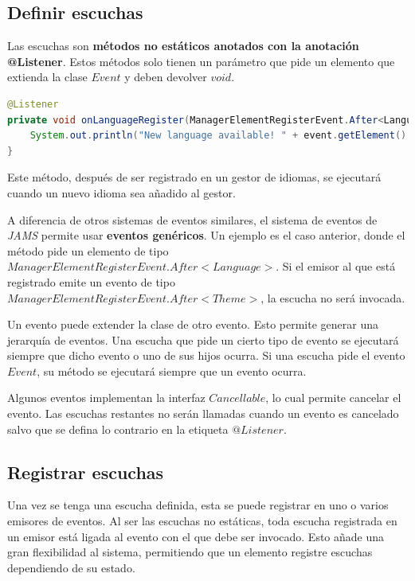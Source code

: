 \subsection{Definir escuchas}\label{subsec:definir-escuchas}

Las escuchas son \textbf{métodos no estáticos anotados con la anotación @Listener}.
Estos métodos solo tienen un parámetro que pide un elemento que extienda la clase
$Event$ y deben devolver $void$.

\begin{lstlisting}[language=Java,style=java,frame=single,label={lst:definir-escuchas}]
@Listener
private void onLanguageRegister(ManagerElementRegisterEvent.After<Language> event) {
    System.out.println("New language available! " + event.getElement().getName());
}
\end{lstlisting}

\noindent Este método, después de ser registrado en un gestor de idiomas,
se ejecutará cuando un nuevo idioma sea añadido al gestor.

\noindent A diferencia de otros sistemas de eventos similares,
el sistema de eventos de \textit{JAMS} permite usar \textbf{eventos genéricos}.
Un ejemplo es el caso anterior, donde el método pide un elemento de tipo
$ManagerElementRegisterEvent.After<Language>$.
Si el emisor al que está registrado emite un evento de tipo
$ManagerElementRegisterEvent.After<Theme>$, la escucha no será invocada.

\noindent Un evento puede extender la clase de otro evento.
Esto permite generar una jerarquía de eventos.
Una escucha que pide un cierto tipo de evento se ejecutará siempre que dicho evento o uno de sus hijos ocurra.
Si una escucha pide el evento $Event$, su método se ejecutará siempre que un evento ocurra.

\noindent Algunos eventos implementan la interfaz $Cancellable$, lo cual permite cancelar el evento.
Las escuchas restantes no serán llamadas cuando un evento es cancelado salvo que se defina lo contrario
en la etiqueta $@Listener$.

\subsection{Registrar escuchas}\label{subsec:registrar-escuchas}

Una vez se tenga una escucha definida, esta se puede registrar en uno o varios emisores de eventos.
Al ser las escuchas no estáticas, toda escucha registrada en un emisor está ligada al evento con el
que debe ser invocado.
Esto añade una gran flexibilidad al sistema, permitiendo que un elemento registre
escuchas dependiendo de su estado.

